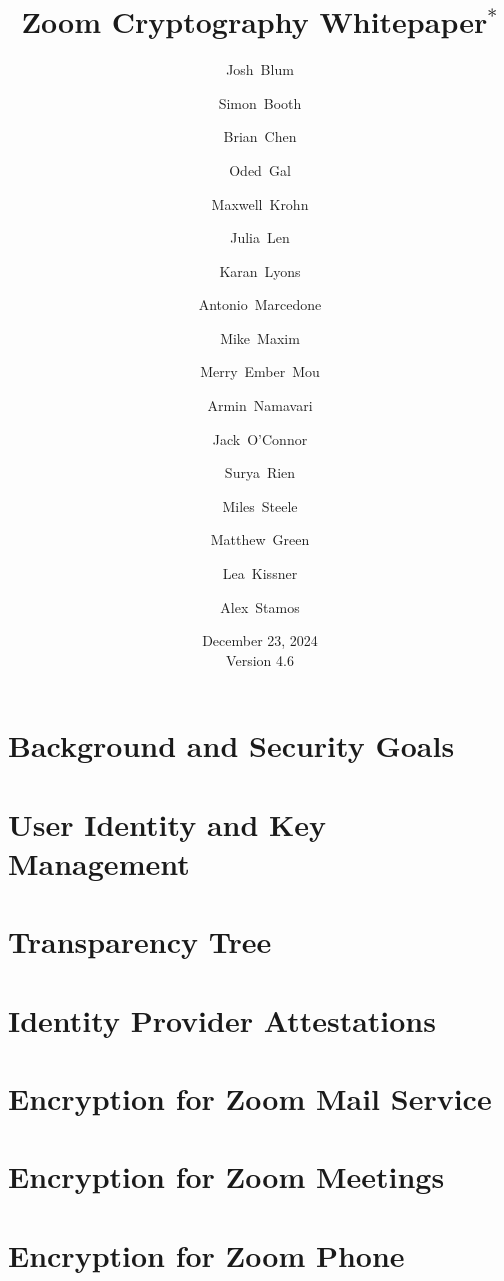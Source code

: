 \documentclass[11pt]{article}
\title{Zoom Cryptography Whitepaper$^*$}
\author[1]{\small Josh~Blum}
\author[1]{\small Simon~Booth}
\author[1]{\small Brian~Chen}
\author[1]{\small Oded~Gal}
\author[1]{\small Maxwell~Krohn}
\author[1]{\small Julia~Len}
\author[1]{\small Karan~Lyons}
\author[1]{\small Antonio~Marcedone}
\author[1]{\small Mike~Maxim}
\author[1]{\small Merry~Ember~Mou}
\author[1]{\small Armin~Namavari}
\author[1]{\small Jack~O'Connor}
\author[1]{\small Surya~Rien}
\author[1]{\small Miles~Steele}
\author[2]{\small Matthew~Green}
\author[  \hspace{-1ex}]{\small Lea~Kissner}
\author[3]{\small Alex~Stamos}
\affil[1]{\footnotesize Zoom~Video~Communications}
\affil[2]{\footnotesize Johns~Hopkins~University}
\affil[3]{\footnotesize Stanford~University}
\date{December 23, 2024 \\ \small Version 4.6}
\begin{document}
    \null  %
    \nointerlineskip  %
    \vfill
    \let\snewpage \newpage
    \let\newpage \relax
    \maketitle
    \thispagestyle{titlepage}
    \let \newpage \snewpage
    \vfill
    \break %

    \tableofcontents
    \newpage
    \renewcommand{\thesection}{\arabic{section}}
    \renewcommand{\thesubsection}{\thesection.\arabic{subsection}}
    

    \section{Background and Security Goals}\label{sec:background_and_goals}
    
    \section{User Identity and Key Management}
    
    \section{Transparency Tree}\label{sec:ztt}
    
    \section{Identity Provider Attestations}\label{sec:idpattestations}
    

    \section{Encryption for Zoom Mail Service}\label{sec:email}
    
    \section{Encryption for Zoom Meetings}\label{sec:meetings}
    
    \section{Encryption for Zoom Phone}\label{sec:phone}
    
    
    \pagebreak
    
    \newpage
    \appendix
    
    
    
\end{document}
